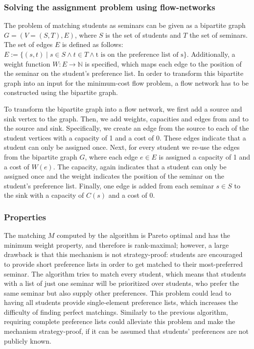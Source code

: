 \subsubsection{Solving the assignment problem using flow-networks}
The problem of matching students as seminars can be given as a bipartite graph $G=(V=(S, T), E)$, where $S$ is the set of students and $T$ the set of seminars. The set of edges $E$ is defined as follows: $E:= \{(s, t) \mid s \in S \land t \in T \land \mbox{t is on the preference list of s}\}$. Additionally, a weight function $W: E \rightarrow  \mathbb{N}$ is specified, which maps each edge to the position of the seminar on the student's preference list. In order to transform this bipartite graph into an input for the minimum-cost flow problem, a flow network has to be constructed using the bipartite graph.

To transform the bipartite graph into a flow network, we first add a source and sink vertex to the graph. Then, we add weights, capacities and edges from and to the source and sink. Specifically, we create an edge from the source to each of the student vertices with a capacity of 1 and a cost of 0. These edges indicate that a student can only be assigned once. Next, for every student we re-use the edges from the bipartite graph $G$, where each edge $e \in E$ is assigned a capacity of 1 and a cost of $W(e)$. The capacity, again indicates that a student can only be assigned once and the weight indicates the position of the seminar on the student's preference list. Finally, one edge is added from each seminar $s \in S$ to the sink with a capacity of $C(s)$ and a cost of 0. 

\subsubsection{Properties}
The matching $M$ computed by the algorithm is Pareto optimal \cite{SngThesis} and has the minimum weight property, and therefore is rank-maximal;\cite{SngThesis} however, a large drawback is that this mechanism is not strategy-proof: students are encouraged to provide short preference lists in order to get matched to their most-preferred seminar. The algorithm tries to match every student, which means that students with a list of just one seminar will be prioritized over students, who prefer the same seminar but also supply other preferences. This problem could lead to having all students provide single-element preference lists, which increases the difficulty of finding perfect matchings. Similarly to the previous algorithm, requiring complete preference lists could alleviate this problem and make the mechanism strategy-proof, if it can be assumed that students' preferences are not publicly known.


